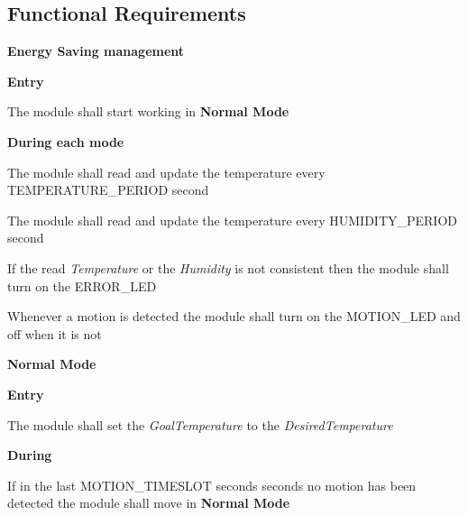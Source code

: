		\subsection{Functional Requirements}

		\begin{req_enum}
			\item \textbf{Energy Saving management}
				\begin{req_enum}[label*=\arabic*.]
					\item \textbf{Entry}
					\begin{req_enum}[label*=\arabic*.]
						\item The module shall start working in \textbf{Normal Mode}
					\end{req_enum}
					\item \textbf{During each mode}
					\begin{req_enum}[label*=\arabic*.]
						\item The module shall read and update the temperature every TEMPERATURE\_PERIOD  second
						\item The module shall read and update the temperature every HUMIDITY\_PERIOD  second
						\item If the read \textit{Temperature} or the \textit{Humidity} is not consistent then the module shall turn on the ERROR\_LED
						\item Whenever a motion is detected the module shall turn on the MOTION\_LED and off when it is not
					\end{req_enum}

					\item \textbf{Normal Mode}
						\begin{req_enum}[label*=\arabic*.]
							\item \textbf{Entry}
								\begin{req_enum}[label*=\arabic*.]
									\item The module shall set the \textit{GoalTemperature} to the \textit{DesiredTemperature}
								\end{req_enum}
							\item \textbf{During}
								\begin{req_enum}[label*=\arabic*.]
									\item If in the last MOTION\_TIMESLOT seconds  seconds no motion has been detected the module shall move in \textbf{Normal Mode}
								\end{req_enum}
						\end{req_enum}


\end{req_enum}
\end{req_enum}
